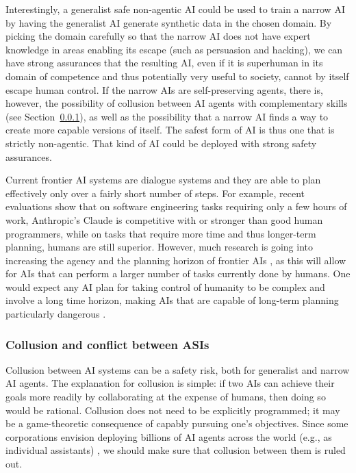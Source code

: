 Interestingly, a generalist safe non-agentic AI could be used to train a narrow AI by having the generalist AI generate synthetic data in the chosen domain. By picking the domain carefully so that the narrow AI does not have expert knowledge in areas enabling its escape (such as persuasion and hacking), we can have strong assurances that the resulting AI, even if it is superhuman in its domain of competence and thus potentially very useful to society, cannot by itself escape human control. If the narrow AIs are self-preserving agents, there is, however, the possibility of collusion between AI agents with complementary skills (see Section~\ref{sec:existential:lossofcontrol:collusionandconflict}), as well as the possibility that a narrow AI finds a way to create more capable versions of itself. The safest form of AI is thus one that is strictly non-agentic. That kind of AI could be deployed with strong safety assurances. 

Current frontier AI systems are dialogue systems and they are able to plan effectively only over a fairly short number of steps. For example, recent evaluations \cite{arxiv.org.abs.2411.15114} show that on software engineering tasks requiring only a few hours of work, Anthropic’s Claude is competitive with or stronger than good human programmers, while on tasks that require more time and thus longer-term planning, humans are still superior. However, much research is going into increasing the agency and the planning horizon of frontier AIs \cite{openai.com.index.introducing.deep.research,openreview.net.forum.id.1ikK0kHjvj}, as this will allow for AIs that can perform a larger number of tasks currently done by humans. One would expect any AI plan for taking control of humanity to be complex and involve a long time horizon, making AIs that are capable of long-term planning particularly dangerous \cite{ojs.aaai.org.aimagazine.index.php.aimagazine.article.view.15084}. 

    \subsubsection{Collusion and conflict between ASIs}
    \label{sec:existential:lossofcontrol:collusionandconflict}

Collusion between AI systems can be a safety risk, both for generalist and narrow AI agents. The explanation for collusion is simple: if two AIs can achieve their goals more readily by collaborating at the expense of humans, then doing so would be rational. Collusion does not need to be explicitly programmed; it may be a game-theoretic consequence of capably pursuing one's objectives. Since some corporations envision deploying billions of AI agents across the world (e.g., as individual assistants) \cite{www.businessinsider.com.jensen.huang.wants.nvidia.to.have.100.million.ai.assistants.2024.10}, we should make sure that collusion between them is ruled out.

